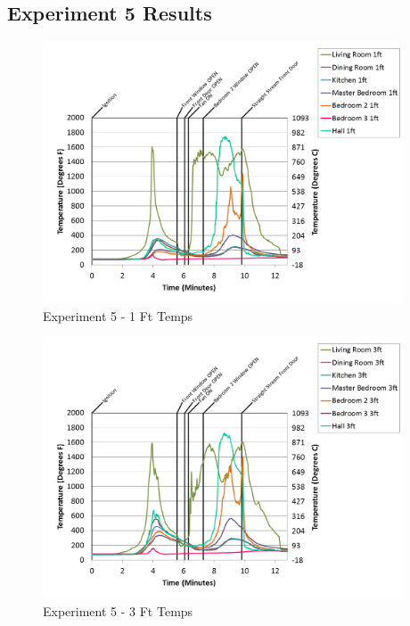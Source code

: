 \documentclass{article}
\begin{document}
\begin{appendices}
\clearpage
\clearpage		\large
\subsection{Experiment 5 Results} \label{App:Exp5Results} 

\begin{figure}[h!]
	\centering
	\includegraphics[height=3.05in]{0_Images/Results_Charts/Exp_5_Charts/1FtTemps.png}
	\caption{Experiment 5 - 1 Ft Temps}
\end{figure}


\begin{figure}[h!]
	\centering
	\includegraphics[height=3.05in]{0_Images/Results_Charts/Exp_5_Charts/3FtTemps.png}
	\caption{Experiment 5 - 3 Ft Temps}
\end{figure}

\clearpage


\end{appendices}
\end{document}

